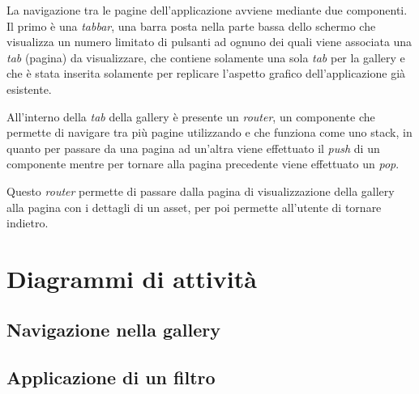 La navigazione tra le pagine dell'applicazione avviene mediante due componenti.
Il primo è una \textit{tabbar}, una barra posta nella parte bassa dello schermo che visualizza un numero limitato di pulsanti ad ognuno dei quali viene associata una \textit{tab} (pagina) da visualizzare, che contiene solamente una sola \textit{tab} per la gallery e che è stata inserita solamente per replicare l'aspetto grafico dell'applicazione già esistente.

All'interno della \textit{tab} della gallery è presente un \textit{router}, un componente che permette di navigare tra più pagine utilizzando e che funziona come uno stack, in quanto per passare da una pagina ad un'altra viene effettuato il \textit{push} di un componente mentre per tornare alla pagina precedente viene effettuato un \textit{pop}.

Questo \textit{router} permette di passare dalla pagina di visualizzazione della gallery alla pagina con i dettagli di un asset, per poi permette all'utente di tornare indietro.

\section{Diagrammi di attività}
\subsection{Navigazione nella gallery}

\subsection{Applicazione di un filtro}
